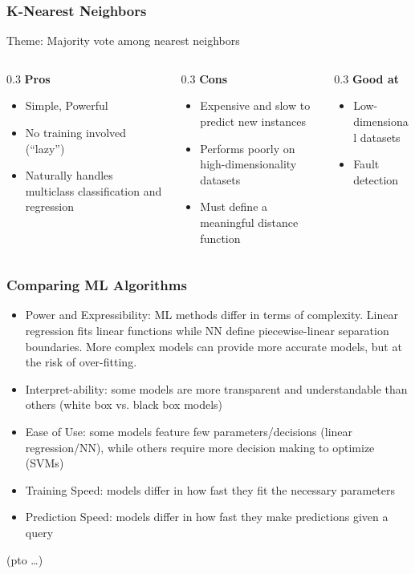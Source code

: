 \begin{frame}\frametitle{K-Nearest Neighbors}
Theme: Majority vote among nearest neighbors

   \begin{columns}[t]
    \begin{column}{0.3\linewidth}
	\textbf{Pros}
		\begin{itemize}
		\item   Simple, Powerful
		\item  No training involved (``lazy'')
		\item Naturally handles multiclass classification
and regression
		\end{itemize}
    \end{column}
    \begin{column}{0.3\linewidth}
	\textbf{Cons}
			\begin{itemize}
		\item   Expensive and slow to predict new instances
		\item  Performs poorly on high-dimensionality datasets
		\item   Must define a meaningful distance function
		\end{itemize}
    \end{column}
	
    \begin{column}{0.3\linewidth}
	\textbf{Good at}
			\begin{itemize}
		\item  Low-dimensional datasets
		\item  Fault detection 
		\end{itemize}
    \end{column}
	
  \end{columns}
\end{frame}



\begin{frame}[fragile]\frametitle{Comparing ML Algorithms}
\begin{itemize}
\item  Power and Expressibility: ML methods differ in terms
of complexity. Linear regression fits linear functions while NN define piecewise-linear separation boundaries. More complex models can provide more accurate models, but
at the risk of over-fitting.
\item  Interpret-ability: some models are more transparent
and understandable than others (white box vs. black box
models)
\item  Ease of Use: some models feature few parameters/decisions (linear regression/NN), while others
require more decision making to optimize (SVMs)
\item  Training Speed: models differ in how fast they fit the
necessary parameters
\item  Prediction Speed: models differ in how fast they make
predictions given a query
\end{itemize}
(pto \ldots)
\end{frame}


